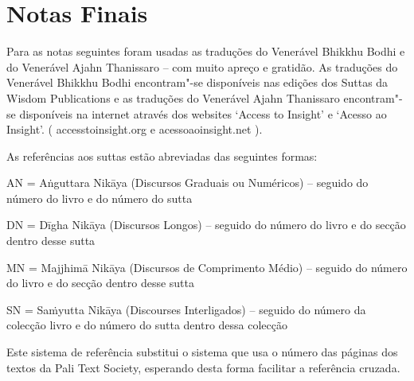 \chapter{Notas Finais}

Para as notas seguintes foram usadas as traduções do Venerável Bhikkhu Bodhi e do Venerável Ajahn Thanissaro -- com muito apreço e gratidão. As traduções do Venerável Bhikkhu Bodhi encontram"-se disponíveis nas edições dos Suttas da Wisdom Publications e as traduções do Venerável Ajahn Thanissaro encontram"-se disponíveis na internet através dos websites `Access to Insight' e `Acesso ao Insight'. ( accesstoinsight.org e acessoaoinsight.net ).

As referências aos suttas estão abreviadas das seguintes formas:

AN = Aṅguttara Nikāya (Discursos Graduais ou Numéricos) -- seguido do número do livro e do número do sutta

DN = Dīgha Nikāya (Discursos Longos) -- seguido do número do livro e do secção dentro desse sutta

MN = Majjhimā Nikāya (Discursos de Comprimento Médio) -- seguido do número do livro e do secção dentro desse sutta

SN = Saṁyutta Nikāya (Discourses Interligados) -- seguido do número da colecção livro e do número do sutta dentro dessa colecção

Este sistema de referência substitui o sistema que usa o número das páginas dos textos da Pali Text Society, esperando desta forma facilitar a referência cruzada.

\printpagenotes*
